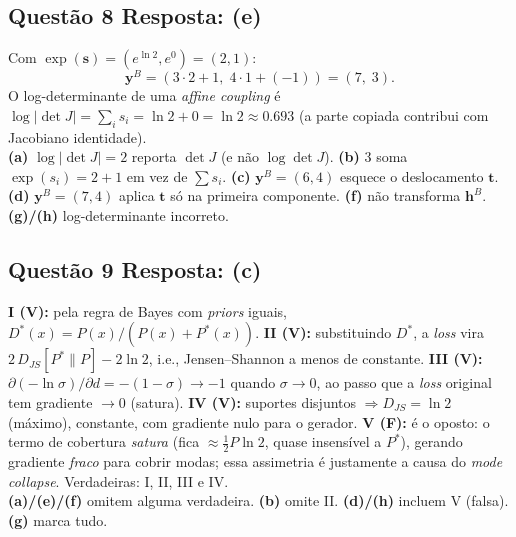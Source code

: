\documentclass[11pt,a4paper]{article}
\begin{document}
\subsection*{Questão 8 \textemdash{} Resposta: (e)}
Com $\exp(\mathbf{s}) = (e^{\ln 2}, e^{0}) = (2, 1)$:
\[
\mathbf{y}^B = (3\cdot 2 + 1,\; 4\cdot 1 + (-1)) = (7,\; 3).
\]
O log-determinante de uma \textit{affine coupling} é $\log\lvert\det J\rvert = \sum_i s_i = \ln 2 + 0 = \ln 2 \approx 0.693$ (a parte copiada contribui com Jacobiano identidade).\\
\textbf{(a)} $\log\lvert\det J\rvert = 2$ reporta $\det J$ (e não $\log\det J$).
\textbf{(b)} $3$ soma $\exp(s_i) = 2 + 1$ em vez de $\sum s_i$.
\textbf{(c)} $\mathbf{y}^B = (6,4)$ esquece o deslocamento $\mathbf{t}$.
\textbf{(d)} $\mathbf{y}^B = (7,4)$ aplica $\mathbf{t}$ só na primeira componente.
\textbf{(f)} não transforma $\mathbf{h}^B$.
\textbf{(g)/(h)} log-determinante incorreto.

\subsection*{Questão 9 \textemdash{} Resposta: (c)}
\textbf{I (V):} pela regra de Bayes com \textit{priors} iguais, $D^{*}(x) = P(x)/(P(x)+P^{*}(x))$.
\textbf{II (V):} substituindo $D^{*}$, a \emph{loss} vira $2\,D_{JS}[P^{*}\|P] - 2\ln 2$, i.e., Jensen--Shannon a menos de constante.
\textbf{III (V):} $\partial(-\ln\sigma)/\partial d = -(1-\sigma) \to -1$ quando $\sigma\to 0$, ao passo que a \emph{loss} original tem gradiente $\to 0$ (satura).
\textbf{IV (V):} suportes disjuntos $\Rightarrow D_{JS} = \ln 2$ (máximo), constante, com gradiente nulo para o gerador.
\textbf{V (F):} é o oposto: o termo de cobertura \emph{satura} (fica $\approx \tfrac{1}{2}P\ln 2$, quase insensível a $P^{*}$), gerando gradiente \emph{fraco} para cobrir modas; essa assimetria é justamente a causa do \textit{mode collapse}.
Verdadeiras: I, II, III e IV.\\
\textbf{(a)/(e)/(f)} omitem alguma verdadeira.
\textbf{(b)} omite II.
\textbf{(d)/(h)} incluem V (falsa).
\textbf{(g)} marca tudo.
\end{document}
